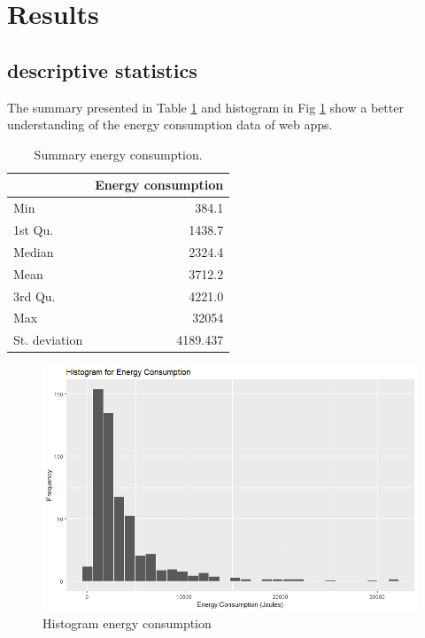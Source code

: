 \section{Results} 
\subsection{descriptive statistics}
The summary presented in Table \ref{tab:table3} and histogram in Fig \ref{fig:histec} show a better understanding of the energy consumption data of web apps. 

\begin{table}[h!]
  \begin{center}
    \begin{tabular}{l|r} %
      \textbf{  } & \textbf{Energy consumption} \\
      \hline
      Min & 384.1\\
      1st Qu. & 1438.7\\
      Median & 2324.4\\
      Mean & 3712.2 \\
      3rd Qu. & 4221.0 \\
      Max & 32054 \\
      St. deviation & 4189.437\\
    \end{tabular}
        \caption{Summary energy consumption.}
           \label{tab:table3}
  \end{center}
\end{table}

\begin{figure}[H]
  \includegraphics[width=\linewidth]{./Images/Hist-EnergyConsumption.png}
  \caption{Histogram energy consumption}
  \label{fig:histec}
\end{figure}

